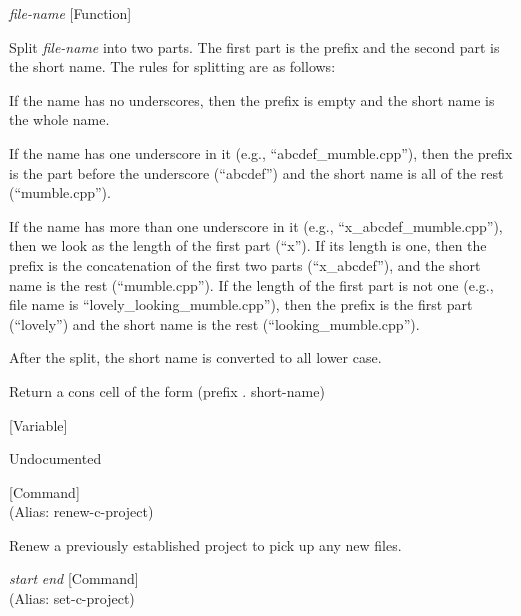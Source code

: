 \vspace{1em}
\noindent
{}
\usebox{\funcname}\emph{file-name}
 \hfill [Function]

\begin{doc-string}
Split \emph{file-name} into two parts.  The first part is the prefix and the second
part is the short name.  The rules for splitting are as follows:

If the name has no underscores, then the prefix is empty and the short name is
the whole name.

If the name has one underscore in it (e.g., ``abcdef\_mumble.cpp''), then the
prefix is the part before the underscore (``abcdef'') and the short name is all
of the rest (``mumble.cpp'').

If the name has more than one underscore in it (e.g., ``x\_abcdef\_mumble.cpp''),
then we look as the length of the first part (``x'').  If its length is one,
then the prefix is the concatenation of the first two parts (``x\_abcdef''), and
the short name is the rest (``mumble.cpp'').  If the length of the first part is
not one (e.g., file name is ``lovely\_looking\_mumble.cpp''), then the prefix is
the first part (``lovely'') and the short name is the rest
(``looking\_mumble.cpp'').

After the split, the short name is converted to all lower case.

Return a cons cell of the form (prefix . short-name)
\end{doc-string}

\vspace{1em}
\noindent
{}
\usebox{\funcname}
 \hfill [Variable]

\begin{doc-string}
Undocumented
\end{doc-string}

\vspace{1em}
\noindent
{}
\usebox{\funcname}
 \hfill [Command]\\%
 (Alias: renew-c-project)

\begin{doc-string}
Renew a previously established project to pick up any new files.
\end{doc-string}

\vspace{1em}
\noindent
{}
\usebox{\funcname}\emph{start} \emph{end}
 \hfill [Command]\\%
 (Alias: set-c-project)

